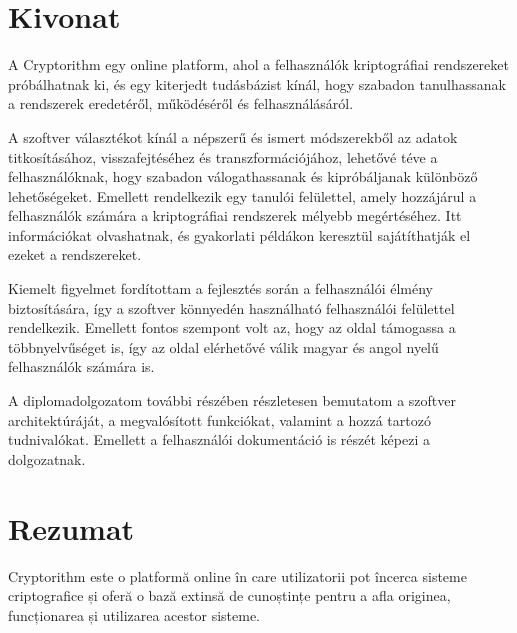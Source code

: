 
\hungarianParagraph


\chapter*{Kivonat}

A Cryptorithm egy online platform, ahol a felhasználók kriptográfiai rendszereket próbálhatnak ki, és egy kiterjedt tudásbázist kínál, hogy szabadon tanulhassanak a rendszerek eredetéről, működéséről és felhasználásáról.

A szoftver választékot kínál a népszerű és ismert módszerekből az adatok titkosításához, visszafejtéséhez és transzformációjához, lehetővé téve a felhasználóknak, hogy szabadon válogathassanak és kipróbáljanak különböző lehetőségeket. Emellett rendelkezik egy tanulói felülettel, amely hozzájárul a felhasználók számára a kriptográfiai rendszerek mélyebb megértéséhez. Itt információkat olvashatnak, és gyakorlati példákon keresztül sajátíthatják el ezeket a rendszereket. 

Kiemelt figyelmet fordítottam a fejlesztés során a felhasználói élmény biztosítására, így a szoftver könnyedén használható felhasználói felülettel rendelkezik. Emellett fontos szempont volt az, hogy az oldal támogassa a többnyelvűséget is, így az oldal elérhetővé válik magyar és angol nyelű felhasználók számára is.

A diplomadolgozatom további részében részletesen bemutatom a szoftver architektúráját, a megvalósított funkciókat, valamint a hozzá tartozó tudnivalókat. Emellett a felhasználói dokumentáció is részét képezi a dolgozatnak.


\vfill
{}

\chapter*{Rezumat}

Cryptorithm este o platformă online în care utilizatorii pot încerca sisteme criptografice și oferă o bază extinsă de cunoștințe pentru a afla originea, funcționarea și utilizarea acestor sisteme.

